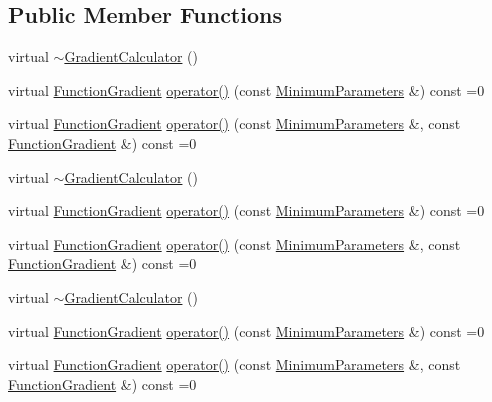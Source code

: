 \subsection*{Public Member Functions}
\begin{DoxyCompactItemize}
\item 
virtual \mbox{\hyperlink{classROOT_1_1Minuit2_1_1GradientCalculator_a918bf4a9fb5ba9ece77d987b44ba33b0}{$\sim$\+Gradient\+Calculator}} ()
\item 
virtual \mbox{\hyperlink{classROOT_1_1Minuit2_1_1FunctionGradient}{Function\+Gradient}} \mbox{\hyperlink{classROOT_1_1Minuit2_1_1GradientCalculator_a1bae913e96ffc9ece28664a5f6f79cb0}{operator()}} (const \mbox{\hyperlink{classROOT_1_1Minuit2_1_1MinimumParameters}{Minimum\+Parameters}} \&) const =0
\item 
virtual \mbox{\hyperlink{classROOT_1_1Minuit2_1_1FunctionGradient}{Function\+Gradient}} \mbox{\hyperlink{classROOT_1_1Minuit2_1_1GradientCalculator_a1809c1e8a89d32aabf7835e9690c2916}{operator()}} (const \mbox{\hyperlink{classROOT_1_1Minuit2_1_1MinimumParameters}{Minimum\+Parameters}} \&, const \mbox{\hyperlink{classROOT_1_1Minuit2_1_1FunctionGradient}{Function\+Gradient}} \&) const =0
\item 
virtual \mbox{\hyperlink{classROOT_1_1Minuit2_1_1GradientCalculator_a918bf4a9fb5ba9ece77d987b44ba33b0}{$\sim$\+Gradient\+Calculator}} ()
\item 
virtual \mbox{\hyperlink{classROOT_1_1Minuit2_1_1FunctionGradient}{Function\+Gradient}} \mbox{\hyperlink{classROOT_1_1Minuit2_1_1GradientCalculator_a1bae913e96ffc9ece28664a5f6f79cb0}{operator()}} (const \mbox{\hyperlink{classROOT_1_1Minuit2_1_1MinimumParameters}{Minimum\+Parameters}} \&) const =0
\item 
virtual \mbox{\hyperlink{classROOT_1_1Minuit2_1_1FunctionGradient}{Function\+Gradient}} \mbox{\hyperlink{classROOT_1_1Minuit2_1_1GradientCalculator_a1809c1e8a89d32aabf7835e9690c2916}{operator()}} (const \mbox{\hyperlink{classROOT_1_1Minuit2_1_1MinimumParameters}{Minimum\+Parameters}} \&, const \mbox{\hyperlink{classROOT_1_1Minuit2_1_1FunctionGradient}{Function\+Gradient}} \&) const =0
\item 
virtual \mbox{\hyperlink{classROOT_1_1Minuit2_1_1GradientCalculator_a918bf4a9fb5ba9ece77d987b44ba33b0}{$\sim$\+Gradient\+Calculator}} ()
\item 
virtual \mbox{\hyperlink{classROOT_1_1Minuit2_1_1FunctionGradient}{Function\+Gradient}} \mbox{\hyperlink{classROOT_1_1Minuit2_1_1GradientCalculator_a1bae913e96ffc9ece28664a5f6f79cb0}{operator()}} (const \mbox{\hyperlink{classROOT_1_1Minuit2_1_1MinimumParameters}{Minimum\+Parameters}} \&) const =0
\item 
virtual \mbox{\hyperlink{classROOT_1_1Minuit2_1_1FunctionGradient}{Function\+Gradient}} \mbox{\hyperlink{classROOT_1_1Minuit2_1_1GradientCalculator_a1809c1e8a89d32aabf7835e9690c2916}{operator()}} (const \mbox{\hyperlink{classROOT_1_1Minuit2_1_1MinimumParameters}{Minimum\+Parameters}} \&, const \mbox{\hyperlink{classROOT_1_1Minuit2_1_1FunctionGradient}{Function\+Gradient}} \&) const =0
\end{DoxyCompactItemize}



